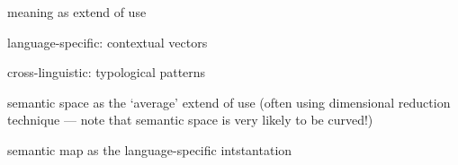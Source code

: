 \label{ch:semanticmaps}

meaning as extend of use

language-specific: contextual vectors

cross-linguistic: typological patterns

semantic space as the `average' extend of use (often using dimensional reduction technique --- note that semantic space is very likely to be curved!)

semantic map as the language-specific intstantation